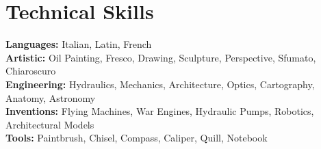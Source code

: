 \documentclass[letterpaper,11pt]{article}
\begin{document}
\vspace{-4mm}
\section{Technical Skills}
 \begin{itemize}[leftmargin=0.15in, label={}]
    \small{\item{
    \textbf{Languages:} Italian, Latin, French \\
    \textbf{Artistic:} Oil Painting, Fresco, Drawing, Sculpture, Perspective, Sfumato, Chiaroscuro \\
    \textbf{Engineering:} Hydraulics, Mechanics, Architecture, Optics, Cartography, Anatomy, Astronomy \\
    \textbf{Inventions:} Flying Machines, War Engines, Hydraulic Pumps, Robotics, Architectural Models \\
    \textbf{Tools:} Paintbrush, Chisel, Compass, Caliper, Quill, Notebook \\
    }}
 \end{itemize}

\end{document}
